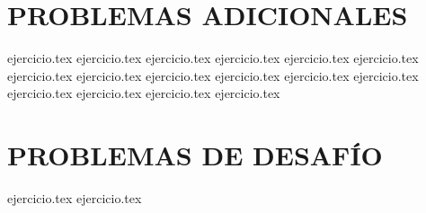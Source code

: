 \section*{PROBLEMAS ADICIONALES}
\begin{enumerate}
    \setcounter{enumi}{32}
    {ejercicio.tex}
    {ejercicio.tex}
    {ejercicio.tex}
    {ejercicio.tex}
    {ejercicio.tex}
    {ejercicio.tex}
    {ejercicio.tex}
    {ejercicio.tex}
    {ejercicio.tex}
    {ejercicio.tex}
    {ejercicio.tex}
    {ejercicio.tex}
    {ejercicio.tex}
    {ejercicio.tex}
    {ejercicio.tex}
    {ejercicio.tex}
\end{enumerate}

\section*{PROBLEMAS DE DESAFÍO}
\begin{enumerate}
    \setcounter{enumi}{48}
    {ejercicio.tex}
    {ejercicio.tex}
\end{enumerate}
